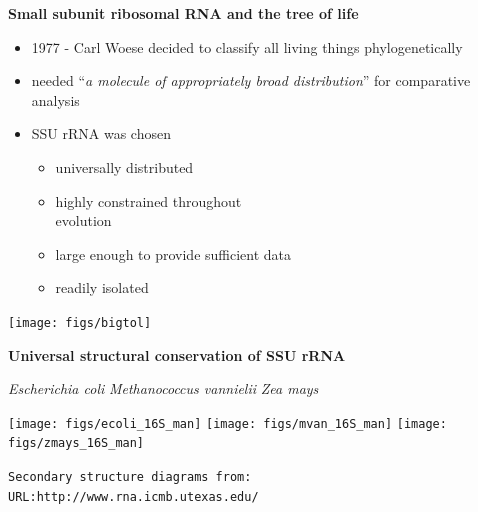 \documentclass[landscape]{slides}
\begin{document}
\begin{slide}
\begin{center}
\large
\textbf{Small subunit ribosomal RNA and the tree of life}
\end{center}
\medskip
\begin{minipage}{5.2in}
\small

\begin{itemize}
\item
1977 - Carl Woese decided to classify all living things phylogenetically
\item
needed ``\emph{a molecule of appropriately broad distribution}'' for
comparative analysis
\item
SSU rRNA was chosen
\begin{itemize}
  \item
    universally distributed
  \item
    highly constrained throughout \\ evolution
  \item
    large enough to provide sufficient data%
  \item
    readily isolated
\end{itemize}
\end{itemize}

\vspace{2.5in}
\end{minipage}
\hspace{0.1in}
\begin{minipage}{5.5in}
\texttt{[image: figs/bigtol]}
\end{minipage}  

\end{slide}

\begin{slide}
\begin{center}
\large
\textbf{Universal structural conservation of SSU rRNA}
\end{center}
\vspace{0.5in}
\small
\hspace{0.75in}
\emph{Escherichia coli}
\hspace{1.2in}
\emph{Methanococcus vannielii}
\hspace{1.2in}
\emph{Zea mays}

\begin{center}
\texttt{[image: figs/ecoli\_16S\_man]}
\texttt{[image: figs/mvan\_16S\_man]}
\texttt{[image: figs/zmays\_16S\_man]}
\end{center}

\begin{flushright}
\tiny{\texttt{Secondary structure diagrams from:}} \\
\tiny{\texttt{URL:http://www.rna.icmb.utexas.edu/}}
\end{flushright}
\vfill
\end{slide}
\end{document}
